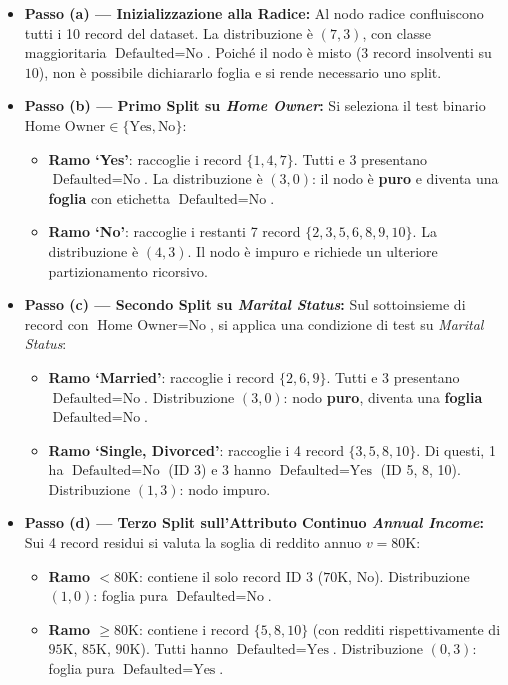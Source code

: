 \begin{itemize}
    \item \textbf{Passo (a) --- Inizializzazione alla Radice:}
    Al nodo radice confluiscono tutti i 10 record del dataset. La distribuzione è $(7, 3)$, con classe maggioritaria $\text{Defaulted} = \text{No}$. Poiché il nodo è misto ($3$ record insolventi su $10$), non è possibile dichiararlo foglia e si rende necessario uno split.
    
    \item \textbf{Passo (b) --- Primo Split su \textit{Home Owner}:}
    Si seleziona il test binario $\text{Home Owner} \in \{\text{Yes}, \text{No}\}$:
    \begin{itemize}
        \item \textbf{Ramo `Yes'}: raccoglie i record $\{1, 4, 7\}$. Tutti e 3 presentano $\text{Defaulted} = \text{No}$. La distribuzione è $(3, 0)$: il nodo è \textbf{puro} e diventa una \textbf{foglia} con etichetta $\text{Defaulted} = \text{No}$.
        \item \textbf{Ramo `No'}: raccoglie i restanti 7 record $\{2, 3, 5, 6, 8, 9, 10\}$. La distribuzione è $(4, 3)$. Il nodo è impuro e richiede un ulteriore partizionamento ricorsivo.
    \end{itemize}

    \item \textbf{Passo (c) --- Secondo Split su \textit{Marital Status}:}
    Sul sottoinsieme di record con $\text{Home Owner} = \text{No}$, si applica una condizione di test su \textit{Marital Status}:
    \begin{itemize}
        \item \textbf{Ramo `Married'}: raccoglie i record $\{2, 6, 9\}$. Tutti e 3 presentano $\text{Defaulted} = \text{No}$. Distribuzione $(3, 0)$: nodo \textbf{puro}, diventa una \textbf{foglia} $\text{Defaulted} = \text{No}$.
        \item \textbf{Ramo `Single, Divorced'}: raccoglie i 4 record $\{3, 5, 8, 10\}$. Di questi, 1 ha $\text{Defaulted} = \text{No}$ (ID 3) e 3 hanno $\text{Defaulted} = \text{Yes}$ (ID 5, 8, 10). Distribuzione $(1, 3)$: nodo impuro.
    \end{itemize}

    \item \textbf{Passo (d) --- Terzo Split sull'Attributo Continuo \textit{Annual Income}:}
    Sui 4 record residui si valuta la soglia di reddito annuo $v = 80\text{K}$:
    \begin{itemize}
        \item \textbf{Ramo $< 80\text{K}$}: contiene il solo record ID 3 ($70\text{K}$, $\text{No}$). Distribuzione $(1, 0)$: foglia pura $\text{Defaulted} = \text{No}$.
        \item \textbf{Ramo $\ge 80\text{K}$}: contiene i record $\{5, 8, 10\}$ (con redditi rispettivamente di $95\text{K}$, $85\text{K}$, $90\text{K}$). Tutti hanno $\text{Defaulted} = \text{Yes}$. Distribuzione $(0, 3)$: foglia pura $\text{Defaulted} = \text{Yes}$.
    \end{itemize}
\end{itemize}

